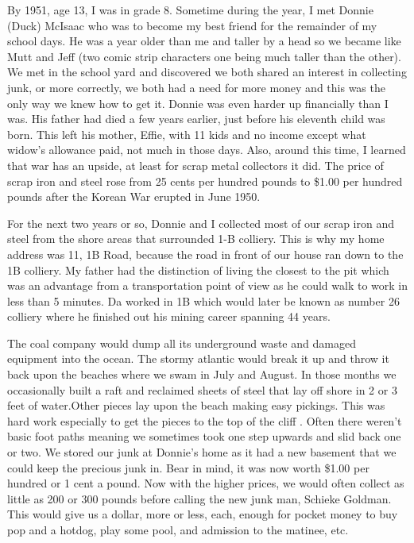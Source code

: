 By 1951, age 13, I was in grade 8. Sometime during the year, I met Donnie (Duck) McIsaac who was to become my best friend for the remainder of my school days. He was a year older than me and taller by a head so we became like Mutt and Jeff (two comic strip characters one being much taller than the other). We met in the school yard and discovered we both shared an interest in collecting junk, or more correctly, we both had a need for more money and this was the only way we knew how to get it. Donnie was even harder up financially than I was. His father had died a few years earlier, just before his eleventh child was born. This left his mother, Effie, with 11 kids and no income except what widow's allowance paid, not much in those days. Also, around this time, I learned that war has an upside, at least for scrap metal collectors it did. The price of scrap iron and steel rose from 25 cents per hundred pounds to \$1.00 per hundred pounds after the Korean War erupted in June 1950.

For the next two years or so, Donnie and I collected most of our scrap iron and steel from the shore areas that surrounded 1-B colliery. This is why my home address was 11, 1B Road, because the road in front of our house ran down to the 1B colliery. My father had the distinction of living the closest to the pit which was an advantage from a transportation point of view as he could walk to work in less than 5 minutes. Da worked in 1B which would later be known as number 26 colliery where he finished out his mining career spanning 44 years.

The coal company would dump all its underground waste and damaged equipment into the ocean. The stormy atlantic would break it up and throw it back upon the beaches where we swam in July and August. In those months we occasionally built a raft and reclaimed sheets of steel that lay off shore in 2 or 3 feet of water.Other pieces lay upon the beach making easy pickings. This was hard work especially to get the pieces to the top of the cliff . Often there weren't basic foot paths meaning we sometimes took one step upwards and slid back one or two. We stored our junk at Donnie's home as it had a new basement that we could keep the precious junk in. Bear in mind, it was now worth \$1.00 per hundred or 1 cent a pound. Now with the higher prices, we would often collect as little as 200 or 300 pounds before calling the new junk man, Schieke Goldman. This would give us a dollar, more or less, each, enough for pocket money to buy pop and a hotdog, play some pool, and admission to the matinee, etc.

